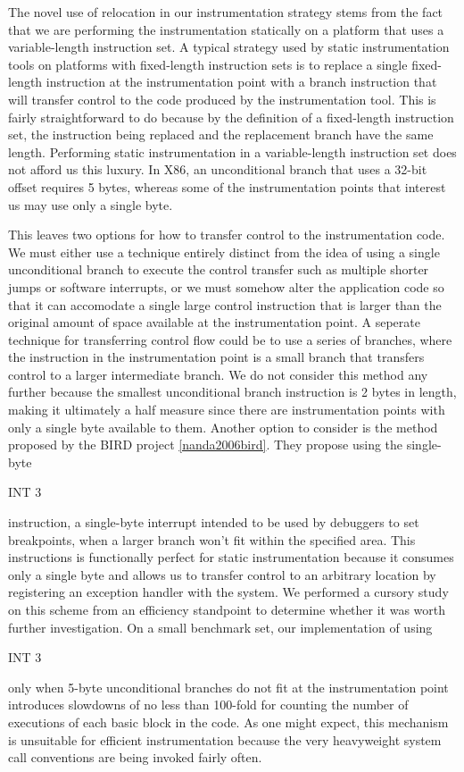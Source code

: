 The novel use of relocation in our instrumentation strategy stems from the fact that we are performing
the instrumentation statically on a platform that uses a variable-length instruction
set. A typical strategy used by static instrumentation tools on platforms with 
fixed-length instruction sets is to replace a single fixed-length instruction at 
the instrumentation point with a branch instruction that will transfer control to 
the code produced by the instrumentation tool. This is fairly straightforward to
do because by the definition of a fixed-length instruction set,
the instruction being replaced and the replacement branch have the same length. Performing
static instrumentation in a variable-length instruction set does not afford us this luxury.
In X86, an unconditional branch that uses a 32-bit offset requires 5 bytes, whereas some
of the instrumentation points that interest us may use only a single byte.

This leaves two options for how to transfer control to the instrumentation code. We must either use 
a technique entirely distinct from the idea of using a single unconditional branch to execute the control
transfer such as multiple shorter jumps or software interrupts, or we must somehow alter the
application code so that it can accomodate a single large control instruction that is larger than the original
amount of space available at the instrumentation point. A seperate technique for transferring control flow
could be to use a series of branches, where the instruction in the instrumentation point is a small branch that
transfers control to a larger intermediate branch. We do not consider this method any further because the smallest
unconditional branch instruction is 2 bytes in length, making it ultimately a half measure since there are instrumentation
points with only a single byte available to them. Another option to consider is the method proposed by the BIRD project 
\ref{nanda2006bird}. They propose using the single-byte \begin{it}INT 3\end{it}
instruction, a single-byte interrupt intended to be used by debuggers to set breakpoints, when a larger branch won't fit within 
the specified area. This instructions is functionally perfect for static instrumentation because it consumes only a single
byte and allows us to transfer control to an arbitrary location by registering an exception handler
with the system. We performed a cursory study on this scheme from an efficiency standpoint to determine whether it was worth
further investigation. On a small benchmark set, our
implementation of using \begin{it}INT 3\end{it} only when 5-byte unconditional branches do
not fit at the instrumentation point introduces slowdowns of no less than 100-fold for counting the
number of executions of each basic block in the code. As one might expect, this mechanism is unsuitable
for efficient instrumentation because the very heavyweight system call conventions are being invoked
fairly often.

